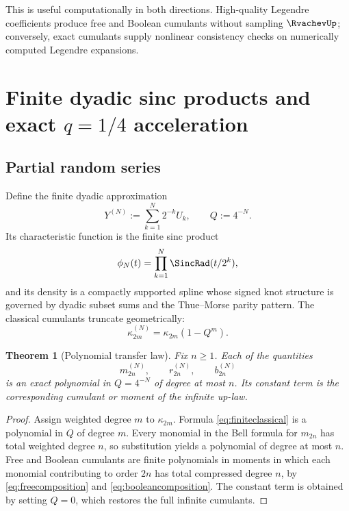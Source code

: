\documentclass[11pt,oneside]{article}
\newtheorem{theorem}{Theorem}[section]
\theoremstyle{definition}
\theoremstyle{remark}
\begin{document}
This is useful computationally in both directions. High-quality Legendre coefficients produce free and Boolean cumulants without sampling \(\RvachevUp\); conversely, exact cumulants supply nonlinear consistency checks on numerically computed Legendre expansions.

\section{Finite dyadic sinc products and exact \texorpdfstring{\(q=1/4\)}{q=1/4} acceleration}
\subsection{Partial random series}
Define the finite dyadic approximation
\begin{equation}\label{eq:finiteY}
Y^{(N)}:=\sum_{k=1}^N2^{-k}U_k,
\qquad Q:=4^{-N}.
\end{equation}
Its characteristic function is the finite sinc product
\[
\phi_N(t)=\prod_{k=1}^N\SincRad(t/2^k),
\]
and its density is a compactly supported spline whose signed knot structure is governed by dyadic subset sums and the Thue--Morse parity pattern. The classical cumulants truncate geometrically:
\begin{equation}\label{eq:finiteclassical}
\kappa_{2m}^{(N)}=\kappa_{2m}(1-Q^m).
\end{equation}

\begin{theorem}[Polynomial transfer law]\label{thm:finitepolynomial}
Fix \(n\ge1\). Each of the quantities
\[
m_{2n}^{(N)},\qquad r_{2n}^{(N)},\qquad b_{2n}^{(N)}
\]
is an exact polynomial in \(Q=4^{-N}\) of degree at most \(n\). Its constant term is the corresponding cumulant or moment of the infinite up-law.
\end{theorem}
\begin{proof}
Assign weighted degree \(m\) to \(\kappa_{2m}\). Formula \eqref{eq:finiteclassical} is a polynomial in \(Q\) of degree \(m\). Every monomial in the Bell formula for \(m_{2n}\) has total weighted degree \(n\), so substitution yields a polynomial of degree at most \(n\). Free and Boolean cumulants are finite polynomials in moments in which each monomial contributing to order \(2n\) has total compressed degree \(n\), by \eqref{eq:freecomposition} and \eqref{eq:booleancomposition}. The constant term is obtained by setting \(Q=0\), which restores the full infinite cumulants.
\end{proof}
\end{document}
